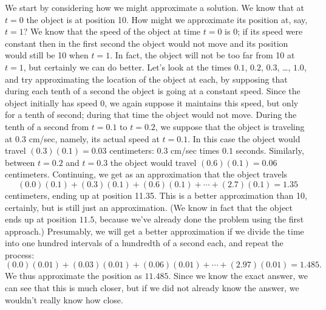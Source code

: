 \begin{example}
We start by considering how we might approximate a solution. We know
that at $t=0$ the object is at position 10. How might we approximate
its position at, say, $t=1$? We know that the speed of the object at
time $t=0$ is $0$; if its speed were constant then in the first second
the object would not move and its position would still be 10 when
$t=1$. In fact, the object will not be too far from 10 at $t=1$, but
certainly we can do better. Let's look at the times $0.1$, $0.2$,
$0.3$, \dots, $1.0$, and try approximating the location of the object
at each, by supposing that during each tenth of a second the object is
going at a constant speed. Since the object initially has speed 0, we
again suppose it maintains this speed, but only for a tenth of second;
during that time the object would not move. During the tenth of a
second from $t=0.1$ to $t=0.2$, we suppose that the object is
traveling at $0.3$ cm/sec, namely, its actual speed at $t=0.1$. In
this case the object would travel $(0.3)(0.1)=0.03$ centimeters: $0.3$
cm/sec times $0.1$ seconds. Similarly, between $t=0.2$ and $t=0.3$ the
object would travel $(0.6)(0.1)=0.06$ centimeters.  Continuing, we get
as an approximation that the object travels
$$
  (0.0)(0.1)+(0.3)(0.1)+(0.6)(0.1)+\cdots+(2.7)(0.1)=1.35
$$ 
centimeters, ending up at position 11.35. This is a better
approximation than 10, certainly, but is still just an
approximation. (We know in fact that the object ends up at position
$11.5$, because we've already done the problem using the first
approach.) Presumably, we will get a better approximation if we divide
the time into one hundred intervals of a hundredth of a second each,
and repeat the process:
$$
  (0.0)(0.01)+(0.03)(0.01)+(0.06)(0.01)+\cdots+(2.97)(0.01)=1.485.
$$
We thus approximate the position as $11.485$. Since we know the exact
answer, we can see that this is much closer, but if we did not already
know the answer, we wouldn't really know how close.


\end{example}
